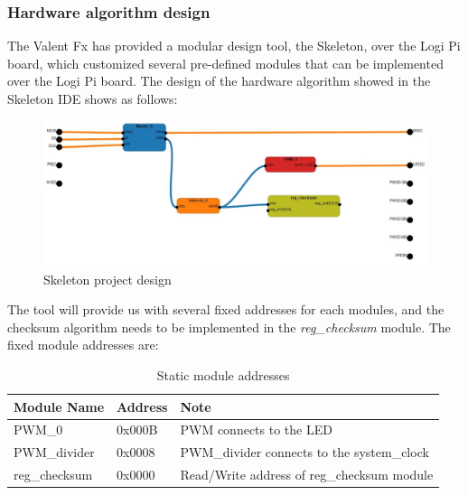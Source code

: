 \documentclass[11pt,openright,a4paper]{report}
\begin{document}
\subsubsection{Hardware algorithm design}
The Valent Fx has provided a modular design tool, the Skeleton, over the Logi Pi board, which customized several pre-defined modules that can be implemented over the Logi Pi board\cite{skeleton}.
The design of the hardware algorithm showed in the Skeleton IDE shows as follows:
\begin{figure}[H]
\centering
\includegraphics[width=0.9\linewidth]{picture/skeletonProj}
\caption{Skeleton project design}
\label{fig:skeletonProj}
\end{figure}
The tool will provide us with several fixed addresses for each modules, and the checksum algorithm needs to be implemented in the \textit{reg\_checksum} module. The fixed module addresses are:
\begin{table}[H]
	\centering
	\caption{Static module addresses}
	\label{my-label}
	\begin{tabular}{@{}lll@{}}
		\toprule
		Module Name   & Address & Note                                       \\ \midrule
		PWM\_0        & 0x000B  & PWM connects to the LED                    \\
		PWM\_divider  & 0x0008  & PWM\_divider connects to the system\_clock \\
		reg\_checksum & 0x0000  & Read/Write address of reg\_checksum module \\ \bottomrule
	\end{tabular}
\end{table}
\end{document}
